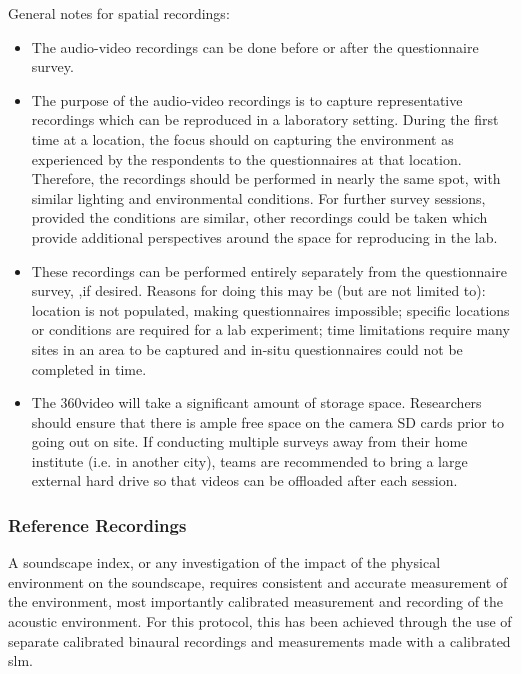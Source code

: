    General notes for spatial recordings:

   \begin{itemize}
     \item The audio-video recordings can be done before or after the questionnaire survey.
     \item The purpose of the audio-video recordings is to capture representative recordings which can be reproduced in a laboratory setting. During the first time at a location, the focus should on capturing the environment as experienced by the respondents to the questionnaires at that location. Therefore, the recordings should be performed in nearly the same spot, with similar lighting and environmental conditions. For further survey sessions, provided the conditions are similar, other recordings could be taken which provide additional perspectives around the space for reproducing in the lab.
     \item These recordings can be performed entirely separately from the questionnaire survey, ,if desired. Reasons for doing this may be (but are not limited to): location is not populated, making questionnaires impossible; specific locations or conditions are required for a lab experiment; time limitations require many sites in an area to be captured and in-situ questionnaires could not be completed in time.
     \item The 360\degree video will take a significant amount of storage space. Researchers should ensure that there is ample free space on the camera SD cards prior to going out on site. If conducting multiple surveys away from their home institute (i.e. in another city), teams are recommended to bring a large external hard drive so that videos can be offloaded after each session.
   \end{itemize}

   \subsubsection{Reference Recordings}

   A soundscape index, or any investigation of the impact of the physical environment on the soundscape, requires consistent and accurate measurement of the environment, most importantly calibrated measurement and recording of the acoustic environment. For this protocol, this has been achieved through the use of separate calibrated binaural recordings and measurements made with a calibrated \gls{slm}.



